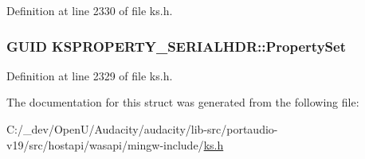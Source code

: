 Definition at line 2330 of file ks.\+h.

\subsubsection[{\texorpdfstring{Property\+Set}{PropertySet}}]{\setlength{\rightskip}{0pt plus 5cm}G\+U\+ID K\+S\+P\+R\+O\+P\+E\+R\+T\+Y\+\_\+\+S\+E\+R\+I\+A\+L\+H\+D\+R\+::\+Property\+Set}\hypertarget{struct_k_s_p_r_o_p_e_r_t_y___s_e_r_i_a_l_h_d_r_a3381c08110f488b315426206ad638523}{}\label{struct_k_s_p_r_o_p_e_r_t_y___s_e_r_i_a_l_h_d_r_a3381c08110f488b315426206ad638523}


Definition at line 2329 of file ks.\+h.



The documentation for this struct was generated from the following file\+:\begin{DoxyCompactItemize}
\item 
C\+:/\+\_\+dev/\+Open\+U/\+Audacity/audacity/lib-\/src/portaudio-\/v19/src/hostapi/wasapi/mingw-\/include/\hyperlink{ks_8h}{ks.\+h}\end{DoxyCompactItemize}
